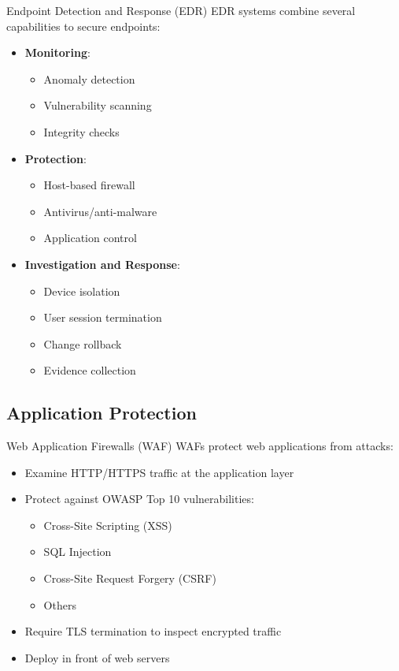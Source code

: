 \begin{concept}{Endpoint Detection and Response (EDR)}
EDR systems combine several capabilities to secure endpoints:
\begin{itemize}
    \item \textbf{Monitoring}:
    \begin{itemize}
        \item Anomaly detection
        \item Vulnerability scanning
        \item Integrity checks
    \end{itemize}
    \item \textbf{Protection}:
    \begin{itemize}
        \item Host-based firewall
        \item Antivirus/anti-malware
        \item Application control
    \end{itemize}
    \item \textbf{Investigation and Response}:
    \begin{itemize}
        \item Device isolation
        \item User session termination
        \item Change rollback
        \item Evidence collection
    \end{itemize}
\end{itemize}
\end{concept}

\subsection{Application Protection}

\begin{definition}{Web Application Firewalls (WAF)}
WAFs protect web applications from attacks:
\begin{itemize}
    \item Examine HTTP/HTTPS traffic at the application layer
    \item Protect against OWASP Top 10 vulnerabilities:
    \begin{itemize}
        \item Cross-Site Scripting (XSS)
        \item SQL Injection
        \item Cross-Site Request Forgery (CSRF)
        \item Others
    \end{itemize}
    \item Require TLS termination to inspect encrypted traffic
    \item Deploy in front of web servers
\end{itemize}
\end{definition}


